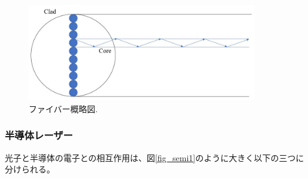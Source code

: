 \documentclass[11pt,a4j]{jsarticle}
\begin{document}
\begin{figure}[h]
 \centering
 \includegraphics[clip,width=10cm]{start_fibor.jpg}
 \caption{ファイバー概略図.}
 \label{fig_fibor1}
\end{figure}

\subsubsection{半導体レーザー}
光子と半導体の電子との相互作用は、図\ref{fig_semi1}のように大きく以下の三つに分けられる。
\end{document}
